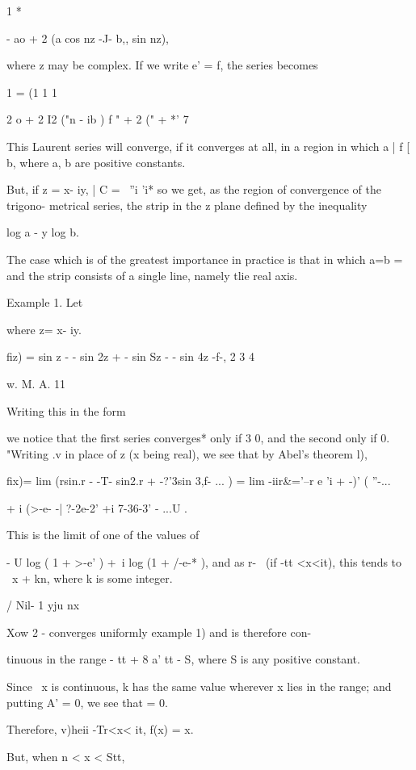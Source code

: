 1 *

- ao + 2 (a cos nz -J- b,, sin nz),

where z may be complex. If we write e' = f, the series becomes

1 = (1 1 1

2 o + 2 I2 ("n - ib ) f " + 2 (" + *' 7

This Laurent series will converge, if it converges at all, in a region
in which a | f [ b, where a, b are positive constants.

But, if z = x- iy, | C = ~''i 'i* so we get, as the region of
convergence of the trigono- metrical series, the strip in the z plane
defined by the inequality

log a - y log b.

The case which is of the greatest importance in practice is that in
which a=b = \, and the strip consists of a single line, namely tlie
real axis.

Example 1. Let

where z= x- iy.

fiz) = sin z - - sin 2z + - sin Sz - - sin 4z -f-,  2 3 4

w. M. A. 11

%
%

Writing this in the form

we notice that the first series converges* only if 3 0, and the second
only if 0. "Writing .v in place of z (x being real), we see that by
Abel's theorem l),

fix)= lim (rsin.r - -T- sin2.r + -?'3sin 3,f- ... ) = lim -iir\&='--r
e 'i + -)' ( ''-...\

+ i (>-e- -| ?-2e-2' +i 7-36-3' - ...U .

This is the limit of one of the values of

- U log ( 1 + >-e' ) +\ i log (1 + /-e-* ), and as r- \ (if -tt
<x<it), this tends to \ x + kn, where k is some integer.

  / Nil- 1 yju nx

Xow 2 - converges uniformly  example 1) and is therefore con-

tinuous in the range - tt + 8 a' tt - S, where S is any positive
constant.

Since \ x is continuous, k has the same value wherever x lies in the
range; and putting A' = 0, we see that = 0.

Therefore, v)heii -Tr<x< it, f(x) = x.

But, when n < x < Stt,


